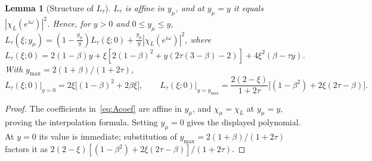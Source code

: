 \documentclass[11pt]{article}
\newtheorem{lemma}[theorem]{Lemma}
\theoremstyle{definition}
\theoremstyle{remark}
\begin{document}
\begin{lemma}[Structure of \(L_\tau\)]\label{lem:struct}
\(L_\tau\) is affine in \(y_\mu\), and at \(y_\mu=y\) it equals
\(|\chi_L(e^{i\omega})|^2\).  Hence, for \(y>0\) and \(0\le y_\mu\le y\),
\(L_\tau(\xi;y_\mu)=(1-\frac{y_\mu}y)L_\tau(\xi;0)+\frac{y_\mu}y|\chi_L(e^{i\omega})|^2\), where
\(L_\tau(\xi;0)=2(1-\beta)y+\xi[2(1-\beta)^2+y(2\tau(3-\beta)-2)]+4\xi^2(\beta-\tau y)\).
With \(y_{\max}=2(1+\beta)/(1+2\tau)\),
\[
L_\tau(\xi;0)\big|_{y=0}=2\xi\bigl[(1-\beta)^2+2\beta\xi\bigr],\qquad
L_\tau(\xi;0)\big|_{y=y_{\max}}=\frac{2(2-\xi)}{1+2\tau}\bigl[(1-\beta^2)+2\xi(2\tau-\beta)\bigr].
\]
\end{lemma}

\begin{proof}
The coefficients in~\eqref{eq:Acoef} are affine in \(y_\mu\), and
\(\chi_\mu=\chi_L\) at \(y_\mu=y\), proving the interpolation
formula.  Setting \(y_\mu=0\) gives the displayed polynomial.
At \(y=0\) its value is immediate; substitution of
\(y_{\max}=2(1+\beta)/(1+2\tau)\) factors it as
\(2(2-\xi)[(1-\beta^2)+2\xi(2\tau-\beta)]/(1+2\tau)\).
\end{proof}
\end{document}
